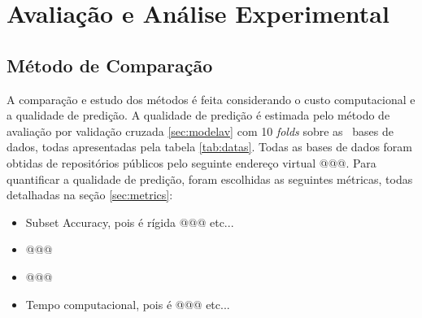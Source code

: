  
 
 
 
 
 
 


%    
%    
%    
%    

 



\chapter{Avaliação e Análise Experimental}
\section{Método de Comparação}
\label{sec:methodcomp}

A comparação e estudo dos métodos é feita considerando o custo computacional e a qualidade de predição.
A qualidade de predição é estimada pelo método de avaliação por validação cruzada \ref{sec:modelav} com 10 \textit{folds}
sobre as \Nbases~bases de dados, todas apresentadas pela tabela \ref{tab:datas}.
Todas as bases de dados foram obtidas de repositórios públicos pelo seguinte
endereço virtual @@@.
Para quantificar a qualidade de predição, foram escolhidas as seguintes métricas, todas detalhadas na seção \ref{sec:metrics}:

\begin{itemize}
 \item Subset Accuracy, pois é rígida @@@ etc...
 \item @@@
 \item @@@
 \item Tempo computacional, pois é @@@ etc...
\end{itemize}

